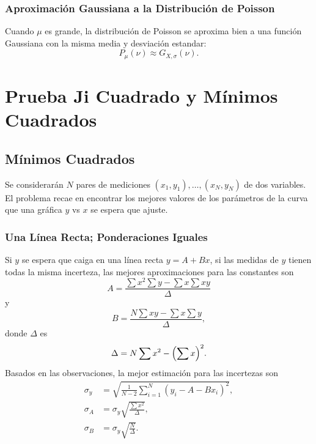 \subsection{Aproximación Gaussiana a la Distribución de Poisson}
Cuando $\mu$ es grande, la distribución de Poisson se aproxima bien a una función Gaussiana con la misma media y desviación estandar:
	\begin{equation}
		P_{\mu} (\nu) \approx G_{X,\sigma} (\nu).
	\end{equation}



\chapter{Prueba Ji Cuadrado y Mínimos Cuadrados}
\section{Mínimos Cuadrados}
Se considerarán $N$ pares de mediciones $(x_1 ,y_1),\ldots ,(x_N ,y_N)$ de dos variables. El problema recae en encontrar los mejores valores de los parámetros de la curva que una gráfica $y$ vs $x$ se espera que ajuste.

\subsection{Una Línea Recta; Ponderaciones Iguales}
Si $y$ se espera que caiga en una línea recta $y = A + Bx$, si las medidas de $y$ tienen todas la misma incerteza, las mejores aproximaciones para las constantes son
	\begin{equation}
		A = \frac{\sum x^2 \sum y - \sum x \sum xy}{\Delta}
	\end{equation}
y
	\begin{equation}
		B = \frac{N\sum xy - \sum x \sum y}{\Delta},
	\end{equation}
donde $\Delta$ es
	\begin{equation}
		\Delta = N\sum x^2 - \qty(\sum x)^2.
	\end{equation}
Basados en las observaciones, la mejor estimación para las incertezas son
	\begin{align}
		\sigma _y &= \sqrt{\frac{1}{N - 2} \sum _{i=1} ^N (y_i - A - Bx_i)^2}, \\
		\sigma _A &= \sigma _y \sqrt{\frac{\sum x^2}{\Delta}}, \\
		\sigma _B &= \sigma _y \sqrt{\frac{N}{\Delta}}.
	\end{align}

